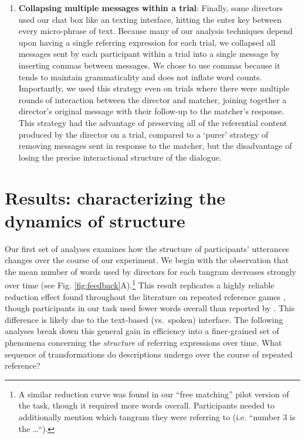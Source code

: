 \documentclass[alpha-refs]{wiley-article}
\begin{document}
\begin{enumerate}
\item \textbf{Collapsing multiple messages within a trial}: Finally, some directors used our chat box like an texting interface, hitting the enter key between every micro-phrase of text. Because many of our analysis techniques depend upon having a single referring expression for each trial, we collapsed all messages sent by each participant within a trial into a single message by inserting commas between messages. We chose to use commas because it tends to maintain grammaticality and does not inflate word counts. Importantly, we used this strategy even on trials where there were multiple rounds of interaction between the director and matcher, joining together a director's original message with their follow-up to the matcher's response. This strategy had the advantage of preserving all of the referential content produced by the director on a trial, compared to a `purer' strategy of removing messages sent in response to the matcher, but the disadvantage of losing the precise interactional structure of the dialogue. 

\end{enumerate}


\section{Results: characterizing the dynamics of structure}
\label{sec:structure}

Our first set of analyses examines how the structure of participants' utterances changes over the course of our experiment.
We begin with the observation that the mean number of words used by directors for each tangram decreases strongly over time (see Fig. \ref{fig:feedback}A).\footnote{A similar reduction curve was found in our  ``free matching'' pilot version of the task, though it required more words overall. Participants needed to additionally mention which tangram they were referring to (i.e. ``number 3 is the \dots``).}
This result replicates a highly reliable reduction effect found throughout the literature on repeated reference games \citep[e.g.][]{KraussWeinheimer64_ReferencePhrases,BrennanClark96_ConceptualPactsConversation}, though participants in our task used fewer words overall than reported by \cite{ClarkWilkesGibbs86_ReferringCollaborative}.
This difference is likely due to the text-based (vs.~spoken) interface.
The following analyses break down this general gain in efficiency into a finer-grained set of phenomena concerning the \emph{structure} of referring expressions over time.
What sequence of transformations do descriptions undergo over the course of repeated reference?
\end{document}
